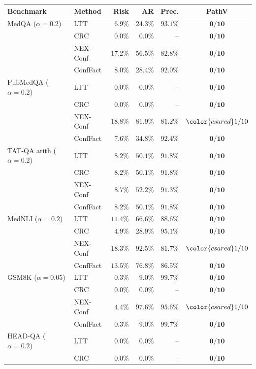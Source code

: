 \begin{table}[t]
\centering\small
\setlength{\tabcolsep}{3pt}
\begin{tabular}{llrrrc}
\toprule
Benchmark & Method & Risk & AR & Prec. & PathV \\
\midrule
MedQA ($\alpha=0.2$) & LTT & $6.9\%$ & $24.3\%$ & $93.1\%$ & $\mathbf{0/10}$ \\
 & CRC & $0.0\%$ & $0.0\%$ & -- & $\mathbf{0/10}$ \\
 & NEX-Conf & $17.2\%$ & $56.5\%$ & $82.8\%$ & $\mathbf{0/10}$ \\
 & ConfFact & $8.0\%$ & $28.4\%$ & $92.0\%$ & $\mathbf{0/10}$ \\
\midrule
PubMedQA ($\alpha=0.2$) & LTT & $0.0\%$ & $0.0\%$ & -- & $\mathbf{0/10}$ \\
 & CRC & $0.0\%$ & $0.0\%$ & -- & $\mathbf{0/10}$ \\
 & NEX-Conf & $18.8\%$ & $81.9\%$ & $81.2\%$ & ${\color{csared}1/10}$ \\
 & ConfFact & $7.6\%$ & $34.8\%$ & $92.4\%$ & $\mathbf{0/10}$ \\
\midrule
TAT-QA arith ($\alpha=0.2$) & LTT & $8.2\%$ & $50.1\%$ & $91.8\%$ & $\mathbf{0/10}$ \\
 & CRC & $8.2\%$ & $50.1\%$ & $91.8\%$ & $\mathbf{0/10}$ \\
 & NEX-Conf & $8.7\%$ & $52.2\%$ & $91.3\%$ & $\mathbf{0/10}$ \\
 & ConfFact & $8.2\%$ & $50.1\%$ & $91.8\%$ & $\mathbf{0/10}$ \\
\midrule
MedNLI ($\alpha=0.2$) & LTT & $11.4\%$ & $66.6\%$ & $88.6\%$ & $\mathbf{0/10}$ \\
 & CRC & $4.9\%$ & $28.9\%$ & $95.1\%$ & $\mathbf{0/10}$ \\
 & NEX-Conf & $18.3\%$ & $92.5\%$ & $81.7\%$ & ${\color{csared}1/10}$ \\
 & ConfFact & $13.5\%$ & $76.8\%$ & $86.5\%$ & $\mathbf{0/10}$ \\
\midrule
GSM8K ($\alpha=0.05$) & LTT & $0.3\%$ & $9.0\%$ & $99.7\%$ & $\mathbf{0/10}$ \\
 & CRC & $0.0\%$ & $0.0\%$ & -- & $\mathbf{0/10}$ \\
 & NEX-Conf & $4.4\%$ & $97.6\%$ & $95.6\%$ & ${\color{csared}1/10}$ \\
 & ConfFact & $0.3\%$ & $9.0\%$ & $99.7\%$ & $\mathbf{0/10}$ \\
\midrule
HEAD-QA ($\alpha=0.2$) & LTT & $0.0\%$ & $0.0\%$ & -- & $\mathbf{0/10}$ \\
 & CRC & $0.0\%$ & $0.0\%$ & -- & $\mathbf{0/10}$ \\

\end{tabular}
\end{table}
